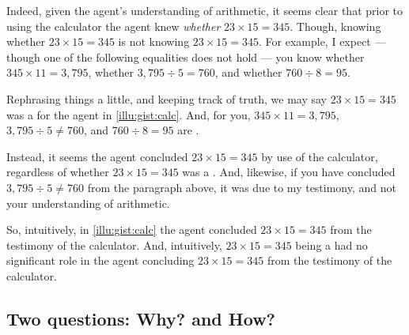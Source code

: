 \begin{note}
  Indeed, given the agent's understanding of arithmetic, it seems clear that prior to using the calculator the agent knew \emph{whether} \(23 \times 15 = 345\).
  Though, knowing whether \(23 \times 15 = 345\) is not knowing \(23 \times 15 = 345\).
  For example, I expect --- though one of the following equalities does not hold --- you know whether \(345 \times 11 = 3,795\), whether \(3,795 \div 5 = 760\), and whether \(760 \div 8 = 95\).

  Rephrasing things a little, and keeping track of truth, we may say \(23 \times 15 = 345\) was a \fc{} for the agent in \autoref{illu:gist:calc}.
  And, for you, \(345 \times 11 = 3,795\), \(3,795 \div 5 \ne 760\), and \(760 \div 8 = 95\) are .

  Instead, it seems the agent concluded \(23 \times 15 = 345\) by use of the calculator, regardless of whether \(23 \times 15 = 345\) was a .
  And, likewise, if you have concluded \(3,795 \div 5 \ne 760\) from the paragraph above, it was due to my testimony, and not your understanding of arithmetic.
\end{note}

\begin{note}
  So, intuitively, in \autoref{illu:gist:calc} the agent concluded \(23 \times 15 = 345\) from the testimony of the calculator.
  And, intuitively, \(23 \times 15 = 345\) being a  had no significant role in the agent concluding \(23 \times 15 = 345\) from the testimony of the calculator.
\end{note}

\subsection{Two questions: Why? and How?}

